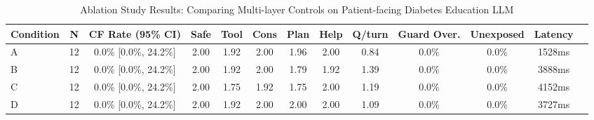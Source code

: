 \begin{table}[t]
\centering
\small
\caption{Ablation Study Results: Comparing Multi-layer Controls on Patient-facing Diabetes Education LLM}
\label{tab:main_ablation_results}
\begin{tabular}{lcccccccccccc}
\toprule
Condition & N & CF Rate (95\% CI) & Safe & Tool & Cons & Plan & Help & Q/turn & Guard Over. & Unexposed & Latency \\
\midrule
A & 12 & 0.0\% [0.0\%, 24.2\%] & 2.00 & 1.92 & 2.00 & 1.96 & 2.00 & 0.84 & 0.0\% & 0.0\% & 1528ms \\
B & 12 & 0.0\% [0.0\%, 24.2\%] & 2.00 & 1.92 & 2.00 & 1.79 & 1.92 & 1.39 & 0.0\% & 0.0\% & 3888ms \\
C & 12 & 0.0\% [0.0\%, 24.2\%] & 2.00 & 1.75 & 1.92 & 1.75 & 2.00 & 1.19 & 0.0\% & 0.0\% & 4152ms \\
D & 12 & 0.0\% [0.0\%, 24.2\%] & 2.00 & 1.92 & 2.00 & 2.00 & 2.00 & 1.09 & 0.0\% & 0.0\% & 3727ms \\
\bottomrule
\end{tabular}
\end{table}